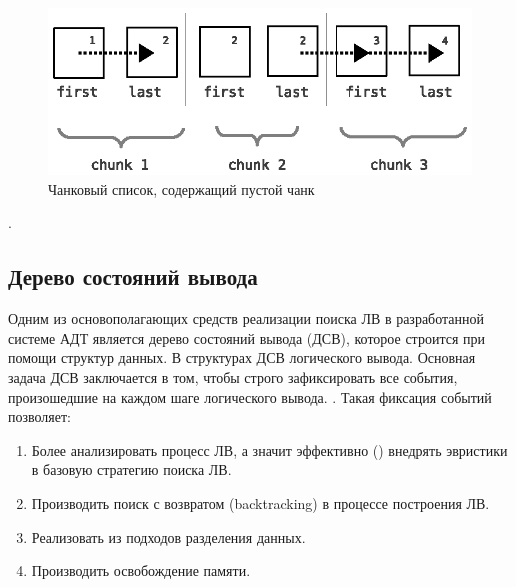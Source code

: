 \begin{figure}[h]
	\centering
	\includegraphics[width=0.6\linewidth]{pics/Chunk2.eps}
	\caption{Чанковый список, содержащий пустой чанк}
	\label{fig:chank2}
\end{figure}

.


\subsection{Дерево состояний вывода}
Одним из основополагающих средств реализации поиска ЛВ в разработанной системе АДТ является дерево состояний вывода (ДСВ), которое строится при помощи  структур данных. В структурах ДСВ  логического вывода. Основная задача ДСВ заключается в том, чтобы строго зафиксировать все события, произошедшие на каждом шаге логического вывода. . Такая фиксация событий позволяет:
\begin{enumerate}
 \item Более  анализировать процесс ЛВ, а значит эффективно () внедрять эвристики в базовую стратегию поиска ЛВ.
 \item Производить поиск с возвратом (backtracking) в процессе построения ЛВ.
 \item Реализовать  из подходов разделения данных.
 \item Производить  освобождение памяти.
\end{enumerate}

